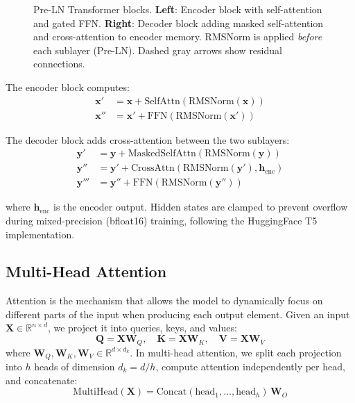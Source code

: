 \documentclass[11pt,a4paper]{article}
\newcommand{\rmsnorm}{\text{RMSNorm}}
\renewcommand{\R}{\mathbb{R}}
\begin{document}
\begin{figure}[t]
\caption{Pre-LN Transformer blocks. \textbf{Left}: Encoder block with self-attention and gated FFN. \textbf{Right}: Decoder block adding masked self-attention and cross-attention to encoder memory. RMSNorm is applied \emph{before} each sublayer (Pre-LN). Dashed gray arrows show residual connections.}
\label{fig:blocks}
\end{figure}

The encoder block computes:
\begin{align}
    \bm{x}' &= \bm{x} + \text{SelfAttn}(\rmsnorm(\bm{x})) \label{eq:enc_attn} \\
    \bm{x}'' &= \bm{x}' + \text{FFN}(\rmsnorm(\bm{x}')) \label{eq:enc_ffn}
\end{align}

The decoder block adds cross-attention between the two sublayers:
\begin{align}
    \bm{y}' &= \bm{y} + \text{MaskedSelfAttn}(\rmsnorm(\bm{y})) \\
    \bm{y}'' &= \bm{y}' + \text{CrossAttn}(\rmsnorm(\bm{y}'), \bm{h}_\text{enc}) \\
    \bm{y}''' &= \bm{y}'' + \text{FFN}(\rmsnorm(\bm{y}''))
\end{align}

where $\bm{h}_\text{enc}$ is the encoder output.
Hidden states are clamped to prevent overflow during mixed-precision (bfloat16) training, following the HuggingFace T5 implementation.

\subsection{Multi-Head Attention}
\label{sec:attention}

Attention is the mechanism that allows the model to dynamically focus on different parts of the input when producing each output element.
Given an input $\bm{X} \in \R^{n \times d}$, we project it into queries, keys, and values:
\begin{equation}
    \bm{Q} = \bm{X}\bm{W}_Q, \quad \bm{K} = \bm{X}\bm{W}_K, \quad \bm{V} = \bm{X}\bm{W}_V
\end{equation}
where $\bm{W}_Q, \bm{W}_K, \bm{W}_V \in \R^{d \times d_k}$.
In multi-head attention, we split each projection into $h$ heads of dimension $d_k = d / h$, compute attention independently per head, and concatenate:
\begin{equation}
    \text{MultiHead}(\bm{X}) = \text{Concat}(\text{head}_1, \ldots, \text{head}_h)\,\bm{W}_O
\end{equation}
\end{document}
